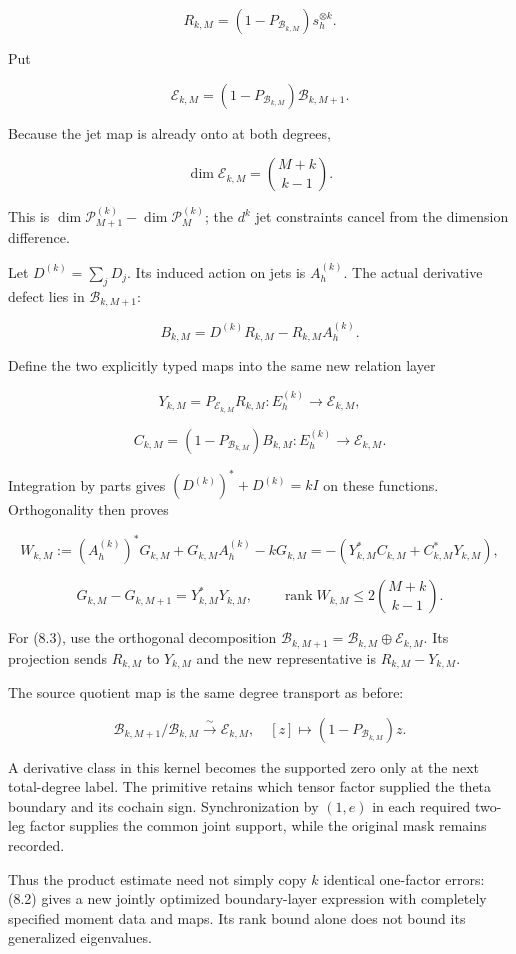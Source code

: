 \[R_{k,M}=(1-P_{\mathcal B_{k,M}})s_h^{\otimes k}.\]

Put

\[\mathcal E_{k,M}=(1-P_{\mathcal B_{k,M}})\mathcal B_{k,M+1}.\]

Because the jet map is already onto at both degrees,

\[\boxed{\dim\mathcal E_{k,M}=\binom{M+k}{k-1}.}\tag{8.1}\]

This is \(\dim\mathcal P_{M+1}^{(k)}-\dim\mathcal P_M^{(k)}\); the
\(d^k\) jet constraints cancel from the dimension difference.

Let \(D^{(k)}=\sum_jD_j\). Its induced action on jets is \(A_h^{(k)}\).
The actual derivative defect lies in \(\mathcal B_{k,M+1}\):

\[B_{k,M}=D^{(k)}R_{k,M}-R_{k,M}A_h^{(k)}.\]

Define the two explicitly typed maps into the same new relation layer

\[Y_{k,M}=P_{\mathcal E_{k,M}}R_{k,M}:E_h^{(k)}\to\mathcal E_{k,M},\]

\[C_{k,M}=(1-P_{\mathcal B_{k,M}})B_{k,M}:E_h^{(k)}\to\mathcal E_{k,M}.\]

Integration by parts gives \((D^{(k)})^*+D^{(k)}=kI\) on these
functions. Orthogonality then proves

\[\boxed{W_{k,M}:=(A_h^{(k)})^*G_{k,M}+G_{k,M}A_h^{(k)}-kG_{k,M}
=-(Y_{k,M}^*C_{k,M}+C_{k,M}^*Y_{k,M}),}\tag{8.2}\]

\[\boxed{G_{k,M}-G_{k,M+1}=Y_{k,M}^*Y_{k,M},\qquad
\operatorname{rank}W_{k,M}\le2\binom{M+k}{k-1}.}\tag{8.3}\]

For (8.3), use the orthogonal decomposition
\(\mathcal B_{k,M+1}=\mathcal B_{k,M}\oplus\mathcal E_{k,M}\). Its
projection sends \(R_{k,M}\) to \(Y_{k,M}\) and the new representative
is \(R_{k,M}-Y_{k,M}\).

The source quotient map is the same degree transport as before:

\[\mathcal B_{k,M+1}/\mathcal B_{k,M}\xrightarrow{\sim}\mathcal E_{k,M},\quad[z]\mapsto(1-P_{\mathcal B_{k,M}})z.\]

A derivative class in this kernel becomes the supported zero only at the
next total-degree label. The primitive retains which tensor factor
supplied the theta boundary and its cochain sign. Synchronization by
\((1,e)\) in each required two-leg factor supplies the common joint
support, while the original mask remains recorded.

Thus the product estimate need not simply copy \(k\) identical
one-factor errors: (8.2) gives a new jointly optimized boundary-layer
expression with completely specified moment data and maps. Its rank
bound alone does not bound its generalized eigenvalues.


